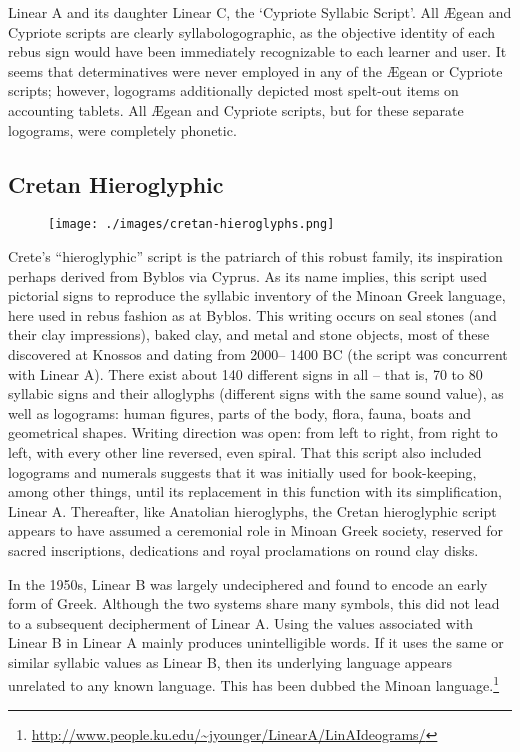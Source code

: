 Linear A and its daughter Linear C, the ‘Cypriote Syllabic
Script’. All Ægean and Cypriote scripts are clearly syllabologographic,
as the objective identity of each rebus sign would
have been immediately recognizable to each learner and user. It
seems that determinatives were never employed in any of the
Ægean or Cypriote scripts; however, logograms additionally
depicted most spelt-out items on accounting tablets. All Ægean
and Cypriote scripts, but for these separate logograms, were
completely phonetic.
\medskip

\subsection{Cretan Hieroglyphic}

\begin{figure}[htbp]
\centering

\texttt{[image: ./images/cretan-hieroglyphs.png]}

\end{figure}


Crete’s \enquote{hieroglyphic} script is the patriarch of this robust
family, its inspiration perhaps derived from Byblos via Cyprus.
As its name implies, this script used pictorial signs to reproduce the syllabic inventory of the Minoan
Greek language, here used in rebus fashion as at Byblos. This
writing occurs on seal stones (and their clay impressions), baked
clay, and metal and stone objects, most of these discovered at
Knossos and dating from 2000– 1400 BC (the script was concurrent
with Linear A). There exist about 140 different signs in all –
that is, 70 to 80 syllabic signs and their alloglyphs (different signs
with the same sound value), as well as logograms: human figures,
parts of the body, flora, fauna, boats and geometrical shapes.
Writing direction was open: from left to right, from right to left,
with every other line reversed, even spiral. That this script also
included logograms and numerals suggests that it was initially
used for book-keeping, among other things, until its replacement
in this function with its simplification, Linear A. Thereafter, like
Anatolian hieroglyphs, the Cretan hieroglyphic script appears to
have assumed a ceremonial role in Minoan Greek society,
reserved for sacred inscriptions, dedications and royal proclamations
on round clay disks.



In the 1950s, Linear B was largely undeciphered and found to encode an early form of Greek. Although the two systems share many symbols, this did not lead to a subsequent decipherment of Linear A. Using the values associated with Linear B in Linear A mainly produces unintelligible words. If it uses the same or similar syllabic values as Linear B, then its underlying language appears unrelated to any known language. This has been dubbed the Minoan language.\footnote{\url{http://www.people.ku.edu/~jyounger/LinearA/LinAIdeograms/}}

